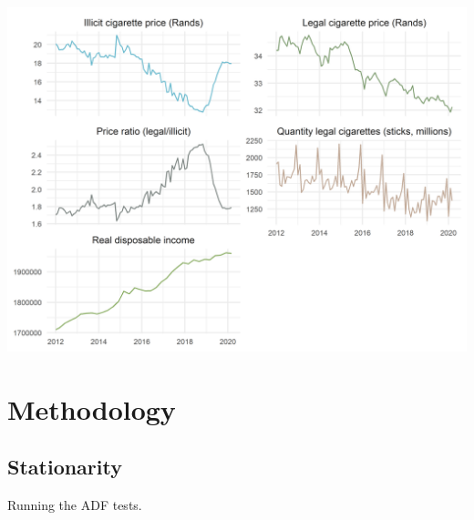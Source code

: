\documentclass[12pt,afrikaans, english,letterpaper,oneside,
openany]{memoir}
\begin{document}
\begin{center}\includegraphics{index_files/figure-latex/graphs-1} \end{center}

\hypertarget{methodology}{%
\chapter{\texorpdfstring{Methodology
\label{methodology}}{Methodology }}\label{methodology}}

\hypertarget{stationarity}{%
\section{\texorpdfstring{Stationarity
\label{stationarity}}{Stationarity }}\label{stationarity}}

Running the ADF tests.

 
  \providecommand{\huxb}[2]{\arrayrulecolor[RGB]{#1}\global\arrayrulewidth=#2pt}
  \providecommand{\huxvb}[2]{\color[RGB]{#1}\vrule width #2pt}
  \providecommand{\huxtpad}[1]{\rule{0pt}{#1}}
  \providecommand{\huxbpad}[1]{\rule[-#1]{0pt}{#1}}
\end{document}
